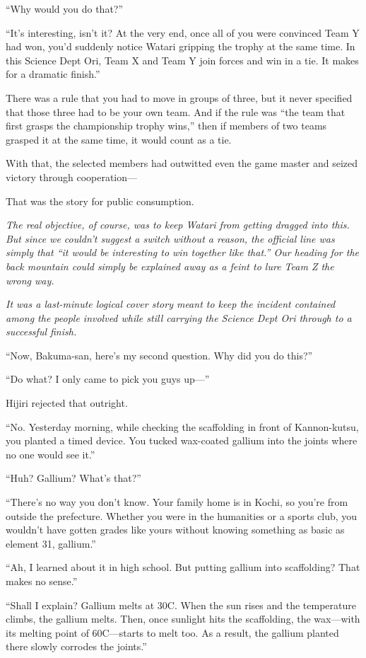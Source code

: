 \documentclass[
    a4paper,
    12pt,
    twoside,
    openany,
    UTF8,
    fontset=windows
]{ctexbook}
\begin{document}
``Why would you do that?''

``It's interesting, isn't it? At the very end, once all of you were convinced Team Y had won, you'd suddenly notice Watari gripping the trophy at the same time. In this Science Dept Ori, Team X and Team Y join forces and win in a tie. It makes for a dramatic finish.''

There was a rule that you had to move in groups of three, but it never specified that those three had to be your own team. And if the rule was ``the team that first grasps the championship trophy wins,'' then if members of two teams grasped it at the same time, it would count as a tie.

With that, the selected members had outwitted even the game master and seized victory through cooperation---

That was the story for public consumption.

\textit{The real objective, of course, was to keep Watari from getting dragged into this. But since we couldn't suggest a switch without a reason, the official line was simply that ``it would be interesting to win together like that.'' Our heading for the back mountain could simply be explained away as a feint to lure Team Z the wrong way.}

\textit{It was a last-minute logical cover story meant to keep the incident contained among the people involved while still carrying the Science Dept Ori through to a successful finish.}

``Now, Bakuma-san, here's my second question. Why did you do this?''

``Do what? I only came to pick you guys up---''

Hijiri rejected that outright.

``No. Yesterday morning, while checking the scaffolding in front of Kannon-kutsu, you planted a timed device. You tucked wax-coated gallium into the joints where no one would see it.''

``Huh? Gallium? What's that?''

``There's no way you don't know. Your family home is in Kochi, so you're from outside the prefecture. Whether you were in the humanities or a sports club, you wouldn't have gotten grades like yours without knowing something as basic as element 31, gallium.''

``Ah, I learned about it in high school. But putting gallium into scaffolding? That makes no sense.''

``Shall I explain? Gallium melts at 30\textdegree C. When the sun rises and the temperature climbs, the gallium melts. Then, once sunlight hits the scaffolding, the wax---with its melting point of 60\textdegree C---starts to melt too. As a result, the gallium planted there slowly corrodes the joints.''
\end{document}
